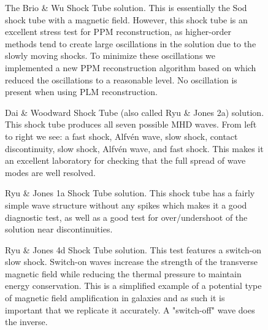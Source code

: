 \begin{figure}[ht!]
    \caption{The Brio \& Wu Shock Tube solution. This is essentially the Sod shock tube with a magnetic field. However, this shock tube is an excellent stress test for PPM reconstruction, as higher-order methods tend to create large oscillations in the solution due to the slowly moving shocks. To minimize these oscillations we implemented a new PPM reconstruction algorithm based on \cite{felker_2020} which reduced the oscillations to a reasonable level. No oscillation is present when using PLM reconstruction.
    }
    \label{fig:brio-and-wu}
\end{figure}

\begin{figure}[ht!]
    \caption{Dai \& Woodward Shock Tube (also called Ryu \& Jones 2a) solution. This shock tube produces all seven possible MHD waves. From left to right we see: a fast shock, Alfvén wave, slow shock, contact discontinuity, slow shock, Alfvén wave, and fast shock. This makes it an excellent laboratory for checking that the full spread of wave modes are well resolved.
    }
    \label{fig:dai-and-woodward}
\end{figure}

\begin{figure}[ht!]
    \caption{Ryu \& Jones 1a Shock Tube solution. This shock tube has a fairly simple wave structure without any spikes which makes it a good diagnostic test, as well as a good test for over/undershoot of the solution near discontinuities.
    }
    \label{fig:rj-1a}
\end{figure}

\begin{figure}[ht!]
    \caption{Ryu \& Jones 4d Shock Tube solution. This test features a switch-on slow shock. Switch-on waves increase the strength of the transverse magnetic field while reducing the thermal pressure to maintain energy conservation. This is a simplified example of a potential type of magnetic field amplification in galaxies and as such it is important that we replicate it accurately. A "switch-off" wave does the inverse.
    }
    \label{fig:rj-4d}
\end{figure}

